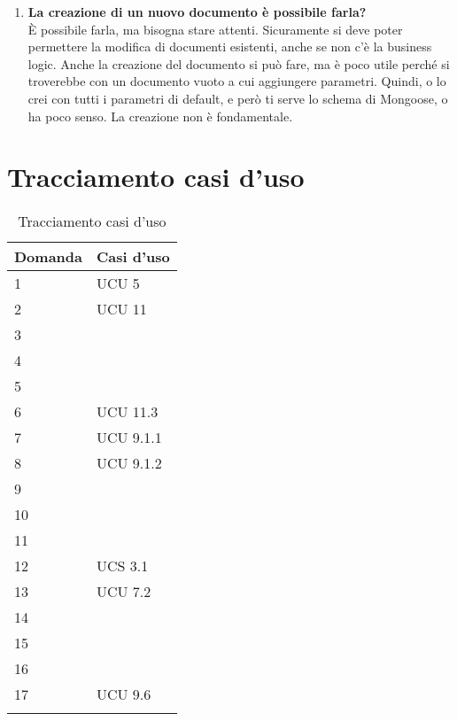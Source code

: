 \begin{enumerate}
		\item
		{\bfseries La creazione di un nuovo documento è possibile farla?} \\
		È possibile farla, ma bisogna stare attenti. Sicuramente si deve poter permettere la modifica di documenti esistenti, anche se non c'è la business logic. Anche la creazione del documento si può fare, ma è poco utile perché si troverebbe con un documento vuoto a cui aggiungere parametri. Quindi, o lo crei con tutti i parametri di default, e però ti serve lo schema di Mongoose, o ha poco senso. La creazione non è fondamentale.
		
	\end{enumerate}
	
	\section{Tracciamento casi d'uso}
	
	\begin{longtable}{ | p{3cm} | p{3cm} | }
	
	\hline
    \textbf{Domanda}  &  \textbf{Casi d'uso}   \\ \hline
   
    1 & UCU 5  \\ \hline
    
    2 & UCU 11 \\ \hline
    
    3 & \\ \hline
    
    4 & \\ \hline
    
    5 & \\ \hline
    
    6 & UCU 11.3 \\ \hline
    
    7 & UCU 9.1.1 \\ \hline
    
    8 & UCU 9.1.2  \\ \hline
    
    9 &  \\ \hline
    
    10 &  \\ \hline
    
    11  & \\ \hline
    
    12 & UCS 3.1 \\ \hline
    
    13 & UCU 7.2 \\ \hline
    
    14 &  \\ \hline
    
    15 &  \\ \hline
    
    16 &  \\ \hline
    
    17 & UCU 9.6 \\ \hline

\caption{Tracciamento casi d'uso}
\end{longtable}